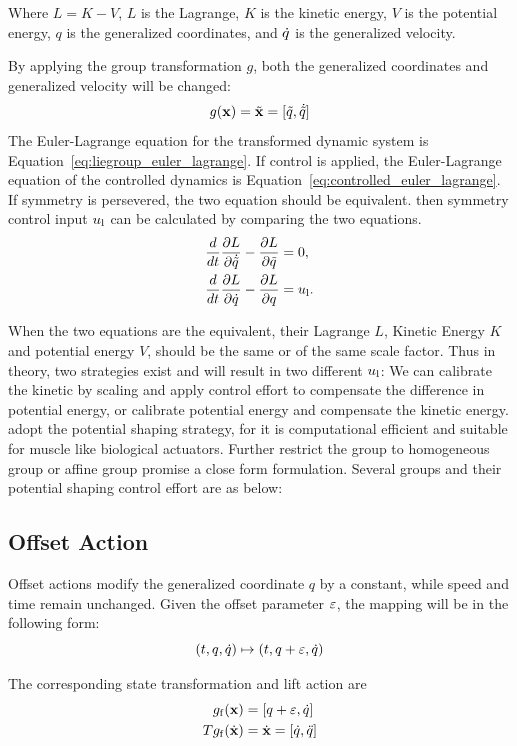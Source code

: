 Where $L=K-V$, $L$ is the Lagrange, $K$ is the kinetic energy, $V$ is the potential energy, $q$ is the generalized coordinates, and $\dot{q}$ is the generalized velocity.

By applying the group transformation $g$, both the generalized coordinates and generalized velocity will be changed:
\[
g(\mathbf{x})=\tilde{\mathbf{x}}=[\tilde{q}, \dot{\tilde{q}}]
\]
The Euler-Lagrange equation for the transformed dynamic system is Equation~\ref{eq:liegroup_euler_lagrange}.
If control is applied, the Euler-Lagrange equation of the controlled dynamics is Equation~\ref{eq:controlled_euler_lagrange}. 
If symmetry is persevered, the two equation should be equivalent.
then symmetry control input $u_{\mathrm{l}}$ can be calculated by comparing the two equations.
\begin{align}
\frac{d}{dt} \frac{\partial L}{\partial \dot{\tilde{q}}} - \frac{\partial L}{\partial \tilde{q} }&=0,\label{eq:liegroup_euler_lagrange}\\
\frac{d}{dt} \frac{\partial L}{\partial \dot{q}} - \frac{\partial L}{\partial q}&=u_{\mathrm{l}}. \label{eq:controlled_euler_lagrange}
\end{align}

When the two equations are the equivalent, their Lagrange $L$, Kinetic Energy $K$ and potential energy $V$, should be the same or of the same scale factor.
Thus in theory, two strategies exist and will result in two different $u_{\mathrm{l}}$:
We can calibrate the kinetic by scaling and apply control effort to compensate the difference in potential energy, or calibrate potential energy and compensate the kinetic energy.
\moit adopt the potential shaping strategy, for it is computational efficient and suitable for muscle like biological actuators.
Further restrict the group to homogeneous group or affine group promise a close form formulation.
Several groups and their potential shaping control effort are as below:



\subsection*{ Offset Action}
Offset actions  modify the generalized coordinate $q$ by a constant, while speed and time remain unchanged.
Given the offset parameter $\varepsilon$, the mapping will be in the following form:
\[
(t,q,\dot{q}) \mapsto (t,q+\varepsilon,\dot{q})
\]

The corresponding state transformation and lift action are
\begin{align}
g_{\mathrm{f}}(\mathbf{x}) &= [q+\varepsilon,\dot{q}] \\
Tg_{\mathrm{f}}(\dot{\mathbf{x}})&=\dot{\mathbf{x}}=[\dot{q},\ddot{q}]
\end{align}


